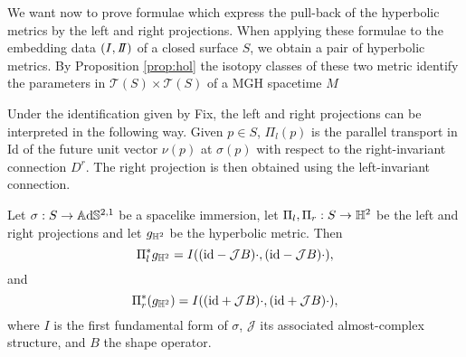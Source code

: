We want now to prove formulae which express the pull-back of the hyperbolic metrics by the left and right projections. When applying these formulae to the embedding data $(I,\II)$ of a closed surface $S$, we obtain a pair of hyperbolic metrics. By Proposition \ref{prop:hol} the isotopy classes of these two metric identify the parameters in $\mathcal{T}(S)\times\mathcal{T}(S)$ of a MGH spacetime $M$

\begin{observation}\label{rem:parallel transport}
    Under the identification given by Fix, the left and right projections can be interpreted in the following way. Given $p\in S$, $\Pi_l(p)$ is the parallel transport in Id of the future unit vector $\nu(p)$ at $\sigma(p)$ with respect to the right-invariant connection $D^r$. The right projection is then obtained using the left-invariant connection. 
\end{observation}

\begin{proposition}\label{prop:left right pull-back metric}
    Let $\sigma:S\to\mathbb{A}\mathrm{d}\mathbb{S}^{2,1}$ be a spacelike immersion, let $\Pi_l,\Pi_r:S\to\mathbb{H}^2$ be the left and right projections and let $g_{\mathbb{H}^2}$ be the hyperbolic metric. Then
    \[
        \Pi_l^*g_{\mathbb{H}^2}=I((\text{id}-\mathcal{J}B)\cdot,(\text{id}-\mathcal{J}B)\cdot),
    \]
        and
    \[
        \Pi_r^*(g_{\mathbb{H}^2})=I((\text{id}+\mathcal{J}B)\cdot,(\text{id}+\mathcal{J}B)\cdot),
    \]
    where $I$ is the first fundamental form of $\sigma$, $\mathcal{J}$ its associated almost-complex structure, and $B$ the shape operator.
\end{proposition}

